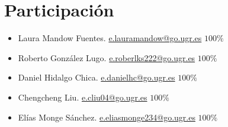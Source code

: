 \documentclass{article}
\newcommand{\email}[1]{\href{mailto:#1}{{{\color{blue}#1}}}}
\begin{document}

    
    

    \newpage

    
\section{Participación}
    \begin{itemize}
        \item Laura Mandow Fuentes. \email{e.lauramandow@go.ugr.es}  $100\%$
        \item Roberto González Lugo. \email{e.roberlks222@go.ugr.es}  $100\%$
        \item Daniel Hidalgo Chica. \email{e.danielhc@go.ugr.es}  $100\%$
        \item Chengcheng Liu. \email{e.cliu04@go.ugr.es} $100\%$
        \item Elías Monge Sánchez. \email{e.eliasmonge234@go.ugr.es}  $100\%$
    \end{itemize}
\end{document}

